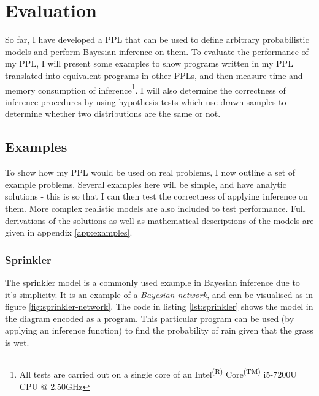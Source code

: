 



\chapter{Evaluation}
So far, I have developed a PPL that can be used to define arbitrary probabilistic models and perform Bayesian inference on them. To evaluate the performance of my PPL, I will present some examples to show programs written in my PPL translated into equivalent programs in other PPLs, and then measure time and memory consumption of inference\footnote{All tests are carried out on a single core of an Intel\textsuperscript{(R)} Core\textsuperscript{(TM)} i5-7200U CPU @ 2.50GHz}. I will also determine the correctness of inference procedures by using hypothesis tests which use drawn samples to determine whether two distributions are the same or not.

\section{Examples}
To show how my PPL would be used on real problems, I now outline a set of example problems. Several examples here will be simple, and have analytic solutions - this is so that I can then test the correctness of applying inference on them. More complex realistic models are also included to test performance. Full derivations of the solutions as well as mathematical descriptions of the models are given in appendix \ref{app:examples}.

\subsection{Sprinkler}
The sprinkler model is a commonly used example in Bayesian inference due to it's simplicity. It is an example of a \textit{Bayesian network}, and can be visualised as in figure \ref{fig:sprinkler-network}. The code in listing \ref{lst:sprinkler} shows the model in the diagram encoded as a program. This particular program can be used (by applying an inference function) to find the probability of rain given that the grass is wet.

